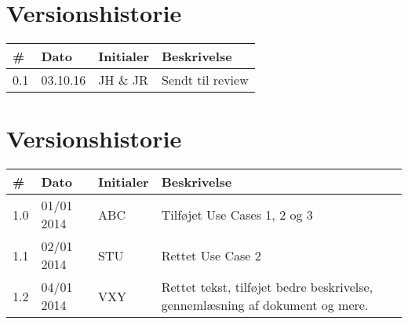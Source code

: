 \documentclass[a4paper, 10pt]{article}
\begin{document}
\section*{Versionshistorie}
\begin{tabular}{p{} p{} p{} p{}}
\hline
\rowcolor{LightSteelBlue3!50}
\textbf{\#} & \textbf{Dato} & \textbf{Initialer} & \textbf{Beskrivelse } \\ \hline
\rowcolor{LightSteelBlue2!50}0.1 & 03.10.16 & JH \& JR & Sendt til review \\ 
 \hline
\end{tabular} 

\section*{Versionshistorie}
\begin{tabular}{p{} p{} p{} p{}}
\hline
\rowcolor{LightSteelBlue3!50}
\textbf{\#} & \textbf{Dato} & \textbf{Initialer} & \textbf{Beskrivelse } \\ \hline
\rowcolor{LightSteelBlue2!50}1.0 & 01/01 2014 & ABC & Tilføjet Use Cases 1, 2 og 3 \\ 
1.1 & 02/01 2014 & STU & Rettet Use Case 2 \\
\rowcolor{LightSteelBlue2!50} 1.2 & 04/01 2014 & VXY & Rettet tekst, tilføjet bedre beskrivelse, gennemlæsning af dokument og mere.\\ \hline
\end{tabular} 


    
\end{document}
